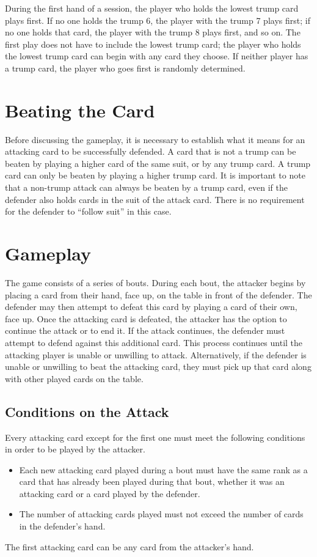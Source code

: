 During the first hand of a session, the player who holds the lowest trump card plays first. If no one holds the trump 6, the player with the trump 7 plays first; if no one holds that card, the player with the trump 8 plays first, and so on. The first play does not have to include the lowest trump card; the player who holds the lowest trump card can begin with any card they choose. If neither player has a trump card, the player who goes first is randomly determined.

\section{Beating the Card} 
\label{BeatingRule}
Before discussing the gameplay, it is necessary to establish what it means for an attacking card to be successfully defended. A card that is not a trump can be beaten by playing a higher card of the same suit, or by any trump card. A trump card can only be beaten by playing a higher trump card. It is important to note that a non-trump attack can always be beaten by a trump card, even if the defender also holds cards in the suit of the attack card. There is no requirement for the defender to ``follow suit'' in this case.

\section{Gameplay}
The game consists of a series of bouts. During each bout, the attacker begins by placing a card from their hand, face up, on the table in front of the defender. The defender may then attempt to defeat this card by playing a card of their own, face up. Once the attacking card is defeated, the attacker has the option to continue the attack or to end it. If the attack continues, the defender must attempt to defend against this additional card. This process continues until the attacking player is unable or unwilling to attack. Alternatively, if the defender is unable or unwilling to beat the attacking card, they must pick up that card along with other played cards on the table.

\subsection{Conditions on the Attack}
\label{attackconditions}
Every attacking card except for the first one must meet the following conditions in order to be played by the attacker.

\begin{itemize}
    \item Each new attacking card played during a bout must have the same rank as a card that has already been played during that bout, whether it was an attacking card or a card played by the defender.
    \item The number of attacking cards played must not exceed the number of cards in the defender's hand.
\end{itemize}
The first attacking card can be any card from the attacker's hand.

